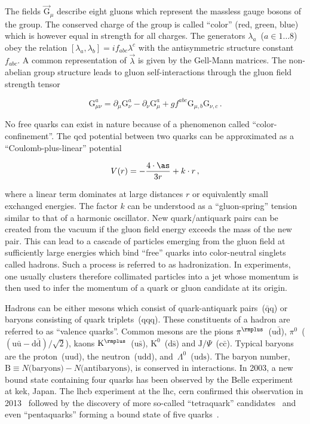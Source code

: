 The fields $\vec{\mathrm{G}}_\mu$ describe eight gluons which represent the massless gauge bosons of the group. The conserved charge of the group is called ``color'' (red, green, blue) which is however equal in strength for all charges. The generators $\lambda_a$~($a\in{1\ldots8}$) obey the relation $[\lambda_a,\lambda_b]=if_{abc}\lambda^c$ with the antisymmetric structure constant $f_{abc}$. A common representation of $\vec{\lambda}$ is given by the Gell-Mann matrices. The non-abelian group structure leads to gluon self-interactions through the gluon field strength tensor

\begin{equation}
\mathrm{G}_{\mu\nu}^{a}=\partial_{\mu} \mathrm{G}_\nu^{a}-\partial_{\nu} \mathrm{G}_{\mu}^{a}+gf^{abc}\mathrm{G}_{\mu,b}\mathrm{G}_{\nu,c}\,.
\end{equation}

No free quarks can exist in nature because of a phenomenon called ``color-confinement''. The \gls{qcd} potential between two quarks can be approximated as a ``Coulomb-plus-linear'' potential~\cite{Sumino2003173}

\begin{equation}
V(r)=-\frac{4\cdot\as}{3r}+k\cdot r\,,
\end{equation}

where a linear term dominates at large distances $r$ or equivalently small exchanged energies. The factor $k$ can be understood as a ``gluon-spring'' tension similar to that of a harmonic oscillator. New quark/antiquark pairs can be created from the vacuum if the gluon field energy exceeds the mass of the new pair. This can lead to a cascade of particles emerging from the gluon field at sufficiently large energies which bind ``free'' quarks into color-neutral singlets called hadrons. Such a process is referred to as hadronization. In experiments, one usually clusters therefore collimated particles into a jet whose momentum is then used to infer the momentum of a quark or gluon candidate at its origin.

Hadrons can be either mesons which consist of quark-antiquark pairs~($\bar{\mathrm{q}}\mathrm{q}$) or baryons consisting of quark triplets~($\mathrm{qqq}$). These constituents of a hadron are referred to as ``valence quarks''. Common mesons are the pions $\pi^{\rmplus}$~($\mathrm{u}\bar{\mathrm{d}}$), $\pi^{0}$~($(\mathrm{u}\bar{\mathrm{u}}-\mathrm{d}\bar{\mathrm{d}})/\sqrt{2}$), kaons $\mathrm{K}^{\rmplus}$~($\mathrm{u}\bar{\mathrm{s}}$), $\mathrm{K}^{0}$~($\mathrm{d}\bar{\mathrm{s}}$) and $\mathrm{J}/\Psi$~($\mathrm{c}\bar{\mathrm{c}}$). Typical baryons are the proton~($\mathrm{uud}$), the neutron~($\mathrm{udd}$), and~$\Lambda^{0}$~($\mathrm{uds}$). The baryon number, $\mathrm{B}\equiv N\text{(baryons)}-N\text{(antibaryons)}$, is conserved in interactions. In 2003, a new bound state containing four quarks has been observed by the Belle experiment~\cite{PhysRevLett.91.262001} at \gls{kek}, Japan. The \gls{lhcb} experiment at the \gls{lhc}, \gls{cern} confirmed this observation in 2013~\cite{Aaij:2013zoa} followed by the discovery of more so-called ``tetraquark'' candidates~\cite{Aaij:2014jqa,Aaij:2016iza} and even ``pentaquarks'' forming a bound state of five quarks~\cite{Aaij:2015tga}.

